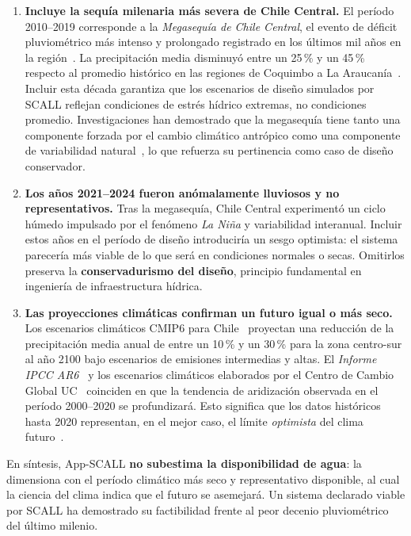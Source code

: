 \documentclass[12pt, a4paper]{article}
\begin{document}
\begin{enumerate}
  \item \textbf{Incluye la sequía milenaria más severa de Chile Central.}
    El período 2010--2019 corresponde a la \textit{Megasequía de Chile Central}, el
    evento de déficit pluviométrico más intenso y prolongado registrado en los últimos
    mil años en la región~\cite{garreaud2020,garreaud2017}. La precipitación media
    disminuyó entre un 25\,\% y un 45\,\% respecto al promedio histórico en las regiones
    de Coquimbo a La Araucanía~\cite{cr2_2015}. Incluir esta década garantiza que los
    escenarios de diseño simulados por SCALL reflejan condiciones de estrés hídrico
    extremas, no condiciones promedio. Investigaciones han demostrado que la megasequía
    tiene tanto una componente forzada por el cambio climático antrópico como una
    componente de variabilidad natural~\cite{boisier2016}, lo que refuerza su pertinencia
    como caso de diseño conservador.

  \item \textbf{Los años 2021--2024 fueron anómalamente lluviosos y no representativos.}
    Tras la megasequía, Chile Central experimentó un ciclo húmedo impulsado por el
    fenómeno \textit{La Niña} y variabilidad interanual. Incluir estos años en el período
    de diseño introduciría un sesgo optimista: el sistema parecería más viable de lo que
    será en condiciones normales o secas. Omitirlos preserva la \textbf{conservadurismo
    del diseño}, principio fundamental en ingeniería de infraestructura hídrica.

  \item \textbf{Las proyecciones climáticas confirman un futuro igual o más seco.}
    Los escenarios climáticos CMIP6 para Chile~\cite{salazar2024} proyectan una reducción
    de la precipitación media anual de entre un 10\,\% y un 30\,\% para la zona
    centro-sur al año 2100 bajo escenarios de emisiones intermedias y altas. El
    \textit{Informe IPCC AR6}~\cite{ipcc_ar6} y los escenarios climáticos elaborados
    por el Centro de Cambio Global UC~\cite{ccg2022} coinciden en que la tendencia
    de aridización observada en el período 2000--2020 se profundizará. Esto significa
    que los datos históricos hasta 2020 representan, en el mejor caso, el límite
    \textit{optimista} del clima futuro~\cite{cr2_2021}.
\end{enumerate}

En síntesis, App-SCALL \textbf{no subestima la disponibilidad de agua}: la dimensiona con
el período climático más seco y representativo disponible, al cual la ciencia del clima
indica que el futuro se asemejará. Un sistema declarado viable por SCALL ha demostrado su
factibilidad frente al peor decenio pluviométrico del último milenio.
\end{document}
